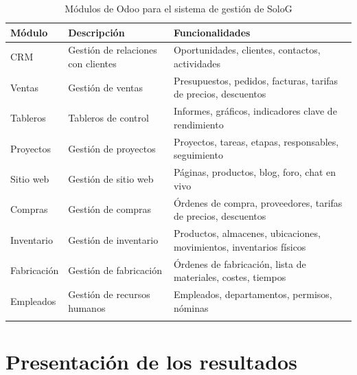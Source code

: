 \documentclass{report}
\begin{document}
        \begin{longtable}{|p{3cm}|p{3cm}|p{7cm}|}
          \hline
          \textbf{Módulo} & \textbf{Descripción} & \textbf{Funcionalidades}\\
          \hline
          \hline
          CRM & Gestión de relaciones con clientes & Oportunidades, clientes, contactos, actividades\\
          \hline
          Ventas & Gestión de ventas & Presupuestos, pedidos, facturas, tarifas de precios, descuentos\\
          \hline
          Tableros & Tableros de control & Informes, gráficos, indicadores clave de rendimiento\\
          \hline
          Proyectos & Gestión de proyectos & Proyectos, tareas, etapas, responsables, seguimiento\\
          \hline
          Sitio web & Gestión de sitio web & Páginas, productos, blog, foro, chat en vivo\\
          \hline
          Compras & Gestión de compras & Órdenes de compra, proveedores, tarifas de precios, descuentos\\
          \hline
          Inventario & Gestión de inventario & Productos, almacenes, ubicaciones, movimientos, inventarios físicos\\
          \hline
          Fabricación & Gestión de fabricación & Órdenes de fabricación, lista de materiales, costes, tiempos\\
          \hline
          Empleados & Gestión de recursos humanos & Empleados, departamentos, permisos, nóminas\\
          \hline
          \caption{Módulos de Odoo para el sistema de gestión de SoloG}
        \end{longtable}
    \chapter{Presentación de los resultados}
\end{document}
